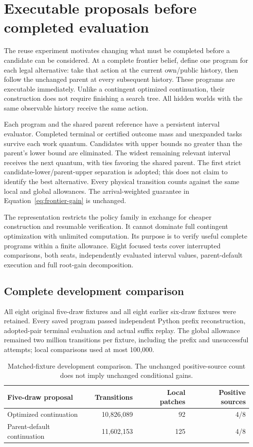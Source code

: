 \section{Executable proposals before completed evaluation}
\label{app:resumable-proposals}
The reuse experiment motivates changing what must be completed before a
candidate can be considered. At a complete frontier belief, define one program
for each legal alternative: take that action at the current own/public history,
then follow the unchanged parent at every subsequent history. These programs
are executable immediately. Unlike a contingent optimized continuation, their
construction does not require finishing a search tree. All hidden worlds with
the same observable history receive the same action.

Each program and the shared parent reference have a persistent interval
evaluator. Completed terminal or certified outcome mass and unexpanded tasks
survive each work quantum. Candidates with upper bounds no greater than the
parent's lower bound are eliminated. The widest remaining relevant interval
receives the next quantum, with ties favoring the shared parent. The first
strict candidate-lower/parent-upper separation is adopted; this does not claim
to identify the best alternative. Every physical transition counts against
the same local and global allowances. The arrival-weighted guarantee in
Equation~\ref{eq:frontier-gain} is unchanged.

The representation restricts the policy family in exchange for cheaper
construction and resumable verification. It cannot dominate full contingent
optimization with unlimited computation. Its purpose is to verify useful
complete programs within a finite allowance. Eight focused tests cover
interrupted comparisons, both seats, independently evaluated interval values,
parent-default execution and full root-gain decomposition.

\subsection{Complete development comparison}
All eight original five-draw fixtures and all eight earlier six-draw fixtures
were retained. Every saved program passed independent Python prefix
reconstruction, adopted-pair terminal evaluation and actual suffix replay.
The global allowance remained two million transitions per fixture, including
the prefix and unsuccessful attempts; local comparisons used at most 100,000.

\begin{table}[ht]
\centering\small
\begin{tabular}{lrrr}
\toprule
Five-draw proposal & Transitions & Local patches & Positive sources \\
\midrule
Optimized continuation & 10,826,089 & 92 & 4/8 \\
Parent-default continuation & 11,602,153 & 125 & 4/8 \\
\bottomrule
\end{tabular}
\caption{Matched-fixture development comparison. The unchanged positive-source
count does not imply unchanged conditional gains.}
\label{tab:resumable-development}
\end{table}

